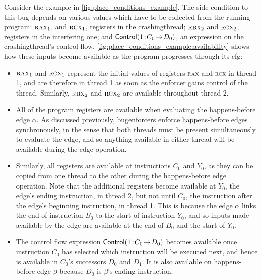 Consider the example in \autoref{fig:place_conditions_example}.  The
side-condition to this bug depends on various values which have to be
collected from the running program: $\textsc{rax}_1$, and
$\textsc{rcx}_1$, registers in the \gls{crashingthread};
$\textsc{rbx}_2$ and $\textsc{rcx}_2$, registers in the interfering
one; and ${\mathsf{Control}}(\mathrm{1}\!:\!C_0\!\rightarrow\!D_0)$, an expression on the
\gls{crashingthread}'s control flow.
\autoref{fig:place_conditions_example:availability} shows how these
inputs become available as the program progresses through its
\gls{cfg}:
\begin{itemize}
\item $\textsc{rax}_1$ and $\textsc{rcx}_1$ represent the initial
  values of registers \textsc{rax} and \textsc{rcx} in thread 1, and
  are therefore in thread 1 as soon as the enforcer gains control of
  the thread.  Similarly, $\textsc{rbx}_2$ and $\textsc{rcx}_2$ are
  available throughout thread 2.
\item All of the program registers are available when evaluating the
  happens-before edge $\alpha$.  As discussed previously, {\technique}
  \glspl{bugenforcer} enforce happens-before edges synchronously, in
  the sense that both threads must be present simultaneously to
  evaluate the edge, and so anything available in either thread will
  be available during the edge operation.
\item Similarly, all registers are available at instructions $C_0$ and
  $Y_0$, as they can be copied from one thread to the other during the
  happens-before edge operation.  Note that the additional registers
  become available at $Y_0$, the edge's ending instruction, in thread
  2, but not until $C_0$, the instruction after the edge's beginning
  instruction, in thread 1.  This is because the edge $\alpha$ links
  the end of instruction $B_0$ to the start of instruction $Y_0$, and
  so inputs made available by the edge are available at the end of
  $B_0$ and the start of $Y_0$.
\item The control flow expression ${\mathsf{Control}}(\mathrm{1}\!:\!C_0\!\rightarrow\!D_0)$ becomes
  available once instruction $C_0$ has selected which instruction will
  be executed next, and hence is available in $C_0$'s successors $D_0$
  and $D_1$.  It is also available on happens-before edge $\beta$ because
  $D_0$ is $\beta$'s ending instruction.
\end{itemize}
